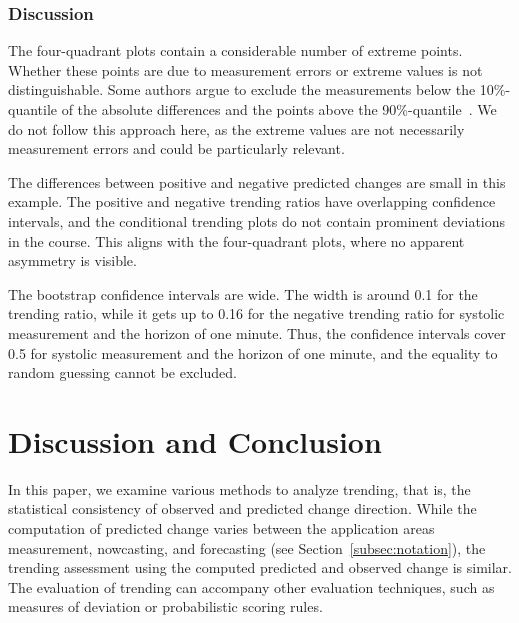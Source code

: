 \documentclass[pdflatex]{sn-jnl}
\theoremstyle{plain}%
\theoremstyle{definition}
\begin{document}
\subsubsection*{Discussion}

The four-quadrant plots contain a considerable number of extreme points.
Whether these points are due to measurement errors or extreme values is not distinguishable.
Some authors argue to exclude the measurements below the 10\%-quantile of the absolute differences and the points above the 90\%-quantile~\citep[see][]{Critchley2010}.
We do not follow this approach here, as the extreme values are not necessarily measurement errors and could be particularly relevant.

The differences between positive and negative predicted changes are small in this example.
The positive and negative trending ratios have overlapping confidence intervals, and the conditional trending plots do not contain prominent deviations in the course.
This aligns with the four-quadrant plots, where no apparent asymmetry is visible.

The bootstrap confidence intervals are wide.
The width is around 0.1 for the trending ratio, while it gets up to 0.16 for the negative trending ratio for systolic measurement and the horizon of one minute.
Thus, the confidence intervals cover 0.5 for systolic measurement and the horizon of one minute, and the equality to random guessing cannot be excluded.



\section{Discussion and Conclusion}\label{sec:trending-conclusion}

In this paper, we examine various methods to analyze trending, that is, the statistical consistency of observed and predicted change direction.
While the computation of predicted change varies between the application areas measurement, nowcasting, and forecasting (see Section~\ref{subsec:notation}), the trending assessment using the computed predicted and observed change is similar.
The evaluation of trending can accompany other evaluation techniques, such as measures of deviation or probabilistic scoring rules.
\end{document}
